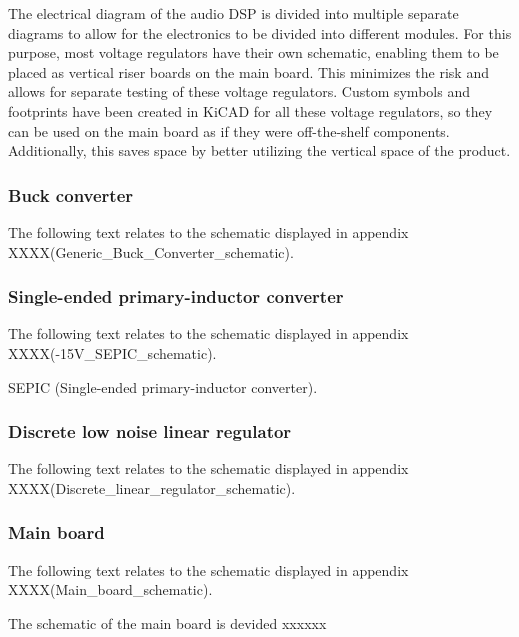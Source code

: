 The electrical diagram of the audio DSP is divided into multiple separate diagrams to allow for the electronics to be divided into different modules. For this purpose, most voltage regulators have their own schematic, enabling them to be placed as vertical riser boards on the main board. This minimizes the risk and allows for separate testing of these voltage regulators. Custom symbols and footprints have been created in KiCAD for all these voltage regulators, so they can be used on the main board as if they were off-the-shelf components. Additionally, this saves space by better utilizing the vertical space of the product.

\subsubsection{Buck converter}
The following text relates to the schematic displayed in appendix XXXX(Generic\_Buck\_Converter\_schematic).

\subsubsection{Single-ended primary-inductor converter}
The following text relates to the schematic displayed in appendix XXXX(-15V\_SEPIC\_schematic).

SEPIC (Single-ended primary-inductor converter).

\subsubsection{Discrete low noise linear regulator}
The following text relates to the schematic displayed in appendix XXXX(Discrete\_linear\_regulator\_schematic).

\subsubsection{Main board}
The following text relates to the schematic displayed in appendix XXXX(Main\_board\_schematic).

The schematic of the main board is devided xxxxxx